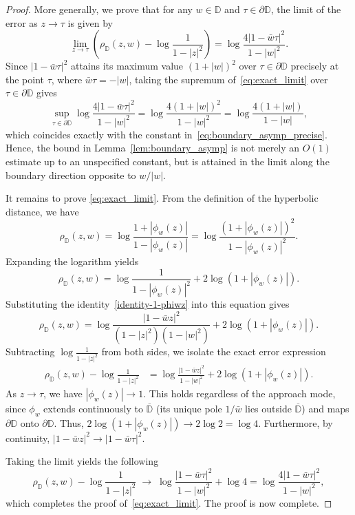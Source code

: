 \documentclass[12pt]{amsart}
\numberwithin{equation}{section}
\theoremstyle{plain}
\theoremstyle{definition}
\begin{document}
\begin{proof}
More generally, we prove that for any $w\in\mathbb{D}$ and $\tau\in\partial\mathbb{D}$, the limit of the error as $z\to\tau$ is given by
\begin{equation}
\label{eq:exact_limit}
\lim_{z\to\tau}
  \left(\rho_{\mathbb{D}}(z,w) - \log\frac{1}{1-|z|^2}\right)
= \log\frac{4|1-\bar{w}\tau|^2}{1-|w|^2}.
\end{equation}
Since $|1-\bar w\tau|^2$ attains its maximum value $(1+|w|)^2$ over $\tau\in\partial\mathbb{D}$ precisely at the point $\tau$, where $\bar w\tau=-|w|$, taking the supremum of~\eqref{eq:exact_limit} over $\tau\in\partial\mathbb{D}$ gives
\begin{equation*}
\sup_{\tau\in\partial\mathbb{D}}\log\frac{4|1-\bar w\tau|^2}{1-|w|^2} = \log\frac{4(1+|w|)^2}{1-|w|^2} = \log\frac{4(1+|w|)}{1-|w|},
\end{equation*}
which coincides exactly with the constant in~\eqref{eq:boundary_asymp_precise}. Hence, the bound in Lemma~\ref{lem:boundary_asymp} is not merely an $O(1)$ estimate up to an unspecified constant, but is attained in the limit along the boundary direction opposite to $w/|w|$.

\noindent
It remains to prove \eqref{eq:exact_limit}. From the definition of the hyperbolic distance, we have
\begin{equation*}
\rho_{\mathbb{D}}(z,w) = \log\frac{1+|\phi_w(z)|}{1-|\phi_w(z)|} = \log\frac{(1+|\phi_w(z)|)^2}{1-|\phi_w(z)|^2}.
\end{equation*}
Expanding the logarithm yields
\begin{equation*}
\rho_{\mathbb{D}}(z,w) = \log\frac{1}{1-|\phi_w(z)|^2} + 2\log(1+|\phi_w(z)|).
\end{equation*}
Substituting the identity~\eqref{identity-1-phiwz} into this equation gives
\begin{equation*}
\rho_{\mathbb{D}}(z,w) = \log\frac{|1-\bar{w}z|^2}{(1-|z|^2)(1-|w|^2)} + 2\log(1+|\phi_w(z)|).
\end{equation*}
Subtracting $\log\frac{1}{1-|z|^2}$ from both sides, we isolate the exact error expression
\begin{align*}
\rho_{\mathbb{D}}(z,w) - \log\frac{1}{1-|z|^2}
&= \log\frac{|1-\bar{w}z|^2}{1-|w|^2} + 2\log(1+|\phi_w(z)|).
\end{align*}
As $z\to\tau$, we have $|\phi_w(z)|\to 1$. This holds regardless of the approach mode, since $\phi_w$ extends continuously to $\overline{\mathbb{D}}$ (its unique pole $1/\bar w$ lies outside $\overline{\mathbb{D}}$) and maps $\partial\mathbb{D}$ onto $\partial\mathbb{D}$. Thus, $2\log(1+|\phi_w(z)|)\to 2\log 2 = \log 4$. Furthermore, by continuity, $|1-\bar{w}z|^2 \to |1-\bar{w}\tau|^2$.

Taking the limit yields the following
\begin{equation*}
\rho_{\mathbb{D}}(z,w) - \log\frac{1}{1-|z|^2}
\;\longrightarrow\;
\log\frac{|1-\bar{w}\tau|^2}{1-|w|^2} + \log 4
= \log\frac{4|1-\bar{w}\tau|^2}{1-|w|^2},
\end{equation*}
which completes the proof of~\eqref{eq:exact_limit}. The proof is now complete.
\end{proof}
\end{document}
